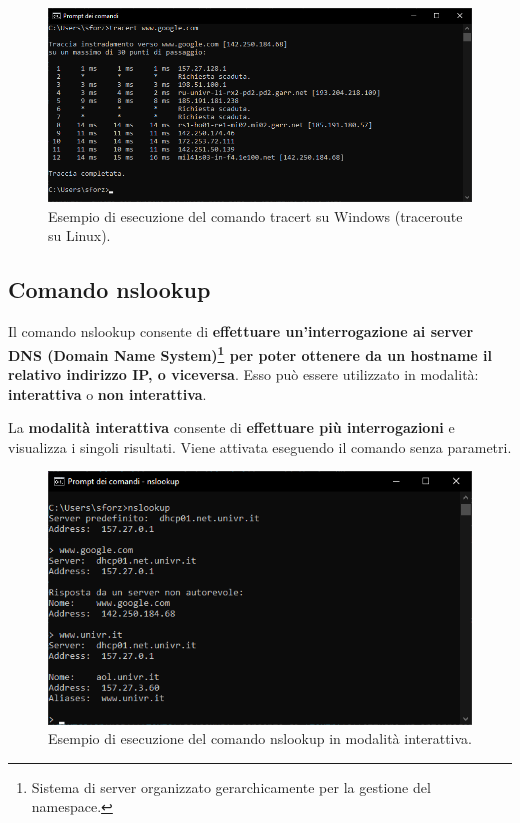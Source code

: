 \documentclass[a4paper]{article}
\begin{document}
	\begin{figure}[!htp]
		\centering
		\includegraphics[width=\textwidth]{img/altri-strumenti/traceroute.png}
		\caption{Esempio di esecuzione del comando \textsf{tracert} su Windows (\textsf{traceroute} su Linux).}
	\end{figure}\newpage

	\subsection{Comando \textsf{nslookup}}
	
	Il comando \textcolor{Red3}{\textsf{nslookup}} consente di \textbf{effettuare un'interrogazione ai server DNS (Domain Name System)\footnote{Sistema di server organizzato gerarchicamente per la gestione del namespace.} per poter ottenere da un hostname il relativo indirizzo IP, o viceversa}. Esso può essere utilizzato in modalità: \textbf{interattiva} o \textbf{non interattiva}.\newline
	
	\noindent
	La \textbf{modalità interattiva} consente di \textbf{effettuare più interrogazioni} e visualizza i singoli risultati. Viene attivata eseguendo il comando senza parametri.
	
	\begin{figure}[!htp]
		\centering
		\includegraphics[width=\textwidth]{img/altri-strumenti/nslookup1.png}
		\caption{Esempio di esecuzione del comando \textsf{nslookup} in modalità interattiva.}
	\end{figure}
\end{document}
